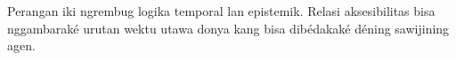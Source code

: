 \documentclass[../../include/open-logic-part]{subfiles}
\begin{document}

\begin{editorial}
Perangan iki ngrembug logika temporal lan epistemik. Relasi aksesibilitas bisa nggambaraké urutan wektu utawa donya kang bisa dibédakaké déning sawijining agen.
\end{editorial}



\OLEndPartHook
\end{document}
